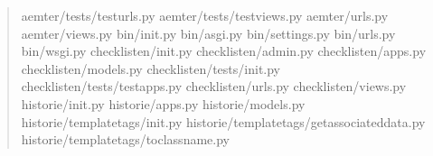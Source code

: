 \documentclass[letterpaper,10pt,english]{sphinxmanual}
\begin{document}
\begin{quote}
\begin{sphinxVerbatim}[commandchars=\\\{\}]
aemter/tests/test\PYGZus{}urls.py                                   \PYGZpc{}
aemter/tests/test\PYGZus{}views.py                                 \PYGZpc{}
aemter/urls.py                                              \PYGZpc{}
aemter/views.py                                            \PYGZpc{}
bin/\PYGZus{}\PYGZus{}init\PYGZus{}\PYGZus{}.py                                             \PYGZpc{}
bin/asgi.py                                                   \PYGZpc{}
bin/settings.py                                            \PYGZpc{}
bin/urls.py                                                 \PYGZpc{}
bin/wsgi.py                                                   \PYGZpc{}
checklisten/\PYGZus{}\PYGZus{}init\PYGZus{}\PYGZus{}.py                                     \PYGZpc{}
checklisten/admin.py                                        \PYGZpc{}
checklisten/apps.py                                         \PYGZpc{}
checklisten/models.py                                      \PYGZpc{}
checklisten/tests/\PYGZus{}\PYGZus{}init\PYGZus{}\PYGZus{}.py                               \PYGZpc{}
checklisten/tests/test\PYGZus{}apps.py                              \PYGZpc{}
checklisten/urls.py                                         \PYGZpc{}
checklisten/views.py                                         \PYGZpc{}
historie/\PYGZus{}\PYGZus{}init\PYGZus{}\PYGZus{}.py                                        \PYGZpc{}
historie/apps.py                                            \PYGZpc{}
historie/models.py                                          \PYGZpc{}
historie/templatetags/\PYGZus{}\PYGZus{}init\PYGZus{}\PYGZus{}.py                           \PYGZpc{}
historie/templatetags/get\PYGZus{}associated\PYGZus{}data.py               \PYGZpc{}
historie/templatetags/to\PYGZus{}class\PYGZus{}name.py                      \PYGZpc{}

\end{sphinxVerbatim}
\end{quote}
\end{document}
